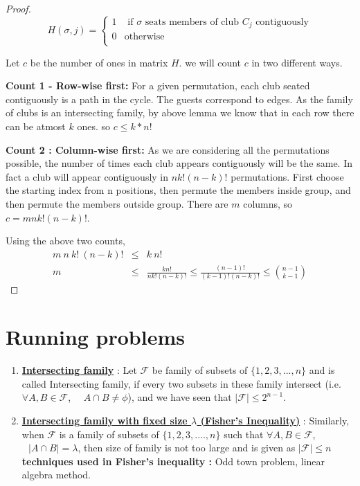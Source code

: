 \begin{theorem}
\begin{proof}
$$H(\sigma,j) = 
\begin{cases}
1 & \textrm{~if $\sigma$ seats members of club $C_j$ contiguously} \\
0 & \textrm{otherwise} \\
\end{cases}
$$

Let $c$ be the number of ones in matrix $H$. we will count $c$ in two different ways.

\begin{description}
\item{\textbf{Count 1 - Row-wise first:}} For a given permutation, each club seated contiguously is a path in the cycle. The guests correspond to edges. As the family of clubs is an intersecting family, by above lemma we know that in each row there can be atmost $k$ ones. so $c \le k*n!$
\item{\textbf{Count 2 : Column-wise first:}} As we are considering all the permutations possible, the number of times each club appears contiguously will be the same. In fact a club will appear contiguously in $nk!(n-k)!$ permutations. First choose the starting index from n positions, then permute the members inside group, and then permute the members outside group. There are $m$ columns, so $c=mnk!(n-k)!$.
\end{description}
Using the above two counts, 
\begin{eqnarray*}
m~n~k!~(n-k)! & \le & k~n! \\ 
m & \le & \frac{kn!}{nk!(n-k)!} \le \frac{(n-1)!}{(k-1)!(n-k)!} \le {n-1 \choose k-1}
\end{eqnarray*}


\end{proof}
\end{theorem}


\section {Running problems}

\begin{enumerate}
    \item \underline{\textbf{Intersecting family}} : Let $\mathcal{F}$ be family of subsets of $\{1,2,3,...,n\}$ and is called Intersecting family, if every two subsets in these family intersect (i.e. $\forall A, B \in \mathcal{F}$, ~~$A \cap B \ne \phi$), and we have seen that $|\mathcal{F}|\le 2^{n-1}$.

    \item \underline{\textbf{Intersecting family with fixed size $\lambda$ (Fisher's Inequality)}} : Similarly, when $\mathcal{F}$ is a family of subsets of $\{1,2,3,....,n\}$ such that $\forall A, B \in \mathcal{F}$, $~~~|A\cap B| = \lambda$, then size of family is not too large and is given as $|\mathcal{F}|\le n$
    \subitem \textbf{techniques used in Fisher's inequality :} Odd town problem, linear algebra method. 
\end{enumerate}

